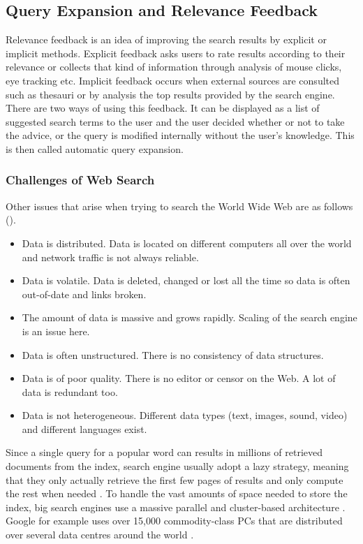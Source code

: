 \subsection{Query Expansion and Relevance Feedback}

Relevance feedback is an idea of improving the search results by explicit or implicit methods. Explicit feedback asks users to rate results according to their relevance or collects that kind of information through analysis of mouse clicks, eye tracking etc. Implicit feedback occurs when external sources are consulted such as thesauri or by analysis the top results provided by the search engine. There are two ways of using this feedback. It can be displayed as a list of suggested search terms to the user and the user decided whether or not to take the advice, or the query is modified internally without the user's knowledge. This is then called automatic query expansion.


\subsubsection*{Challenges of Web Search}

Other issues that arise when trying to search the World Wide Web are as follows (\autocite[p.449]{Baeza-Yates2011}).

\begin{itemize}
  \item Data is distributed. Data is located on different computers all over the world and network traffic is not always reliable.
  \item Data is volatile. Data is deleted, changed or lost all the time so data is often out-of-date and links broken.
  \item The amount of data is massive and grows rapidly. Scaling of the search engine is an issue here.
  \item Data is often unstructured. There is no consistency of data structures.
  \item Data is of poor quality. There is no editor or censor on the Web. A lot of data is redundant too.
  \item Data is not heterogeneous. Different data types (text, images, sound, video) and different languages exist.
\end{itemize}

Since a single query for a popular word can results in  millions of retrieved documents from the index, search engine usually adopt a lazy strategy, meaning that they only actually retrieve the first few pages of results and only compute the rest when needed \autocite[p.459]{Baeza-Yates2011}. To handle the vast amounts of space needed to store the index, big search engines use a massive parallel and cluster-based architecture \autocite[p.459]{Baeza-Yates2011}. Google for example uses over 15,000 commodity-class PCs that are distributed over several data centres around the world \autocite{Dean2003}.


